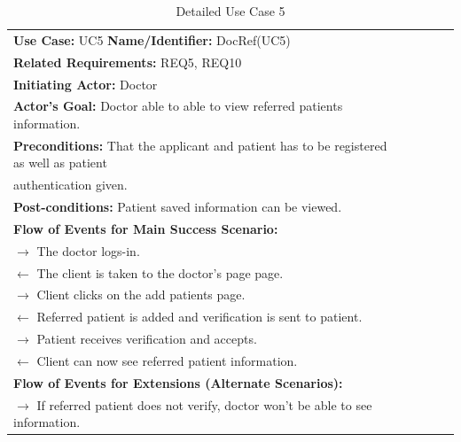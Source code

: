 \documentclass[a4paper]{article}
\begin{document}
\FloatBarrier

\begin{table}[h!]
\centering
\caption*{Detailed Use Case 5}
\label{DetailedUC2}
\begin{tabular}{|c|llll}
\cline{1-1}

\multicolumn{1}{|l|}{\textbf{Use Case:} UC5 \textbf{Name/Identifier:} DocRef(UC5)} &  &  &  &  \\ \cline{1-1}

\multicolumn{1}{|l|}{\textbf{Related Requirements:} REQ5, REQ10} &  &  &  &  \\

\multicolumn{1}{|l|}{\textbf{Initiating Actor:} Doctor} &  &  &  &  \\

\multicolumn{1}{|l|}{\textbf{Actor’s Goal:} Doctor able to able to view referred patients information.} &  &  &  &  \\

\multicolumn{1}{|l|}{\textbf{Preconditions:} That the applicant and patient has to be registered as well as patient} &  &  &  &  \\

\multicolumn{1}{|l|}{authentication given.} &  &  &  &  \\

\multicolumn{1}{|l|}{\textbf{Post-conditions:} Patient saved information can be viewed.} &  &  &  &  \\

\multicolumn{1}{|l|}{\textbf{Flow of Events for Main Success Scenario:}} &  &  &  &  \\

\multicolumn{1}{|l|}{ $ \rightarrow $ The doctor logs-in.} &  &  &  &  \\

\multicolumn{1}{|l|}{ $ \leftarrow $ The client is taken to the doctor's page page.} &  &  &  &  \\

\multicolumn{1}{|l|}{ $ \rightarrow $ Client clicks on the add patients page.} &  &  &  &  \\

\multicolumn{1}{|l|}{ $ \leftarrow $ Referred patient is added and verification is sent to patient.} &  &  &  &  \\

\multicolumn{1}{|l|}{ $ \rightarrow $ Patient receives verification and accepts.} &  &  &  &  \\

\multicolumn{1}{|l|}{ $ \leftarrow $ Client can now see referred patient information.} &  &  &  &  \\

\multicolumn{1}{|l|}{\textbf{Flow of Events for Extensions (Alternate Scenarios):}} &  &  &  &  \\

\multicolumn{1}{|l|}{ $ \rightarrow $ If referred patient does not verify, doctor won't be able to see information.} &  &  &  &  \\ \cline{1-1}

\end{tabular}
\end{table}
\end{document}
